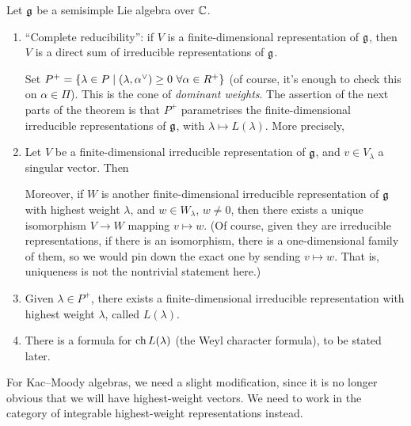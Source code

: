 \begin{theorem}
Let $\mathfrak{g}$ be a semisimple Lie algebra over $\mathbb{C}$.
\begin{enumerate}
  \item ``Complete reducibility'': if $V$ is a finite-dimensional
    representation of $\mathfrak{g}$, then $V$ is a direct sum of irreducible
    representations of $\mathfrak{g}$.

    Set $P^+ = \{\lambda \in P \mid (\lambda, \alpha^{\vee}) \geq 0 \ \forall \alpha \in R^+\}$
    (of course, it's enough to check this on $\alpha \in \Pi$). This is the
    cone of \emph{dominant weights}. The assertion of the next parts of the
    theorem is that $P^+$ parametrises the finite-dimensional irreducible
    representations of $\mathfrak{g}$, with $\lambda \mapsto L(\lambda)$. More
    precisely,
  \item Let $V$ be a finite-dimensional irreducible representation of $\mathfrak{g}$,
    and $v \in V_\lambda$ a singular vector. Then
    Moreover, if $W$ is another finite-dimensional irreducible representation
    of $\mathfrak{g}$ with highest weight $\lambda$, and $w \in W_\lambda$, $w \neq 0$,
    then there exists a unique isomorphism $V \to W$ mapping $v \mapsto w$.
    (Of course, given they are irreducible representations, if there is an
    isomorphism, there is a one-dimensional family of them, so we would pin
    down the exact one by sending $v \mapsto w$. That is, uniqueness is not
    the nontrivial statement here.)
  \item Given $\lambda \in P^+$, there exists a finite-dimensional irreducible
    representation with highest weight $\lambda$, called $L(\lambda)$.
  \item There is a formula for $\operatorname{ch} L(\lambda)$ (the Weyl character formula),
    to be stated later.
\end{enumerate}
\end{theorem}

\begin{remark}
For Kac--Moody algebras, we need a slight modification, since it is no longer
obvious that we will have highest-weight vectors. We need to work in the
category of integrable highest-weight representations instead.
\end{remark}

